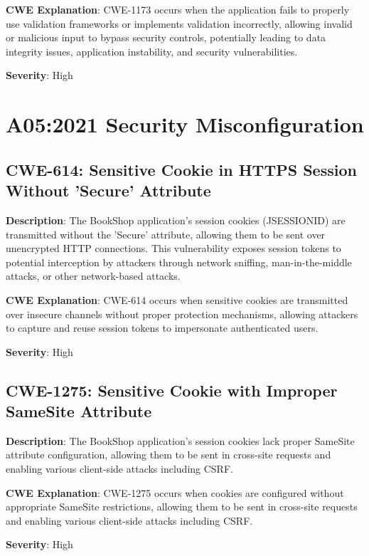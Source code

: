 \documentclass[]{UCD_CS_FYP_Report}
\begin{document}
\textbf{CWE Explanation}: CWE-1173 occurs when the application fails to properly use validation frameworks or implements validation incorrectly, allowing invalid or malicious input to bypass security controls, potentially leading to data integrity issues, application instability, and security vulnerabilities.

\textbf{Severity}: High




\chapter{A05:2021 Security Misconfiguration}

\section{CWE-614: Sensitive Cookie in HTTPS Session Without 'Secure' Attribute}

\textbf{Description}: The BookShop application's session cookies (JSESSIONID) are transmitted without the 'Secure' attribute, allowing them to be sent over unencrypted HTTP connections. This vulnerability exposes session tokens to potential interception by attackers through network sniffing, man-in-the-middle attacks, or other network-based attacks.

\textbf{CWE Explanation}: CWE-614 occurs when sensitive cookies are transmitted over insecure channels without proper protection mechanisms, allowing attackers to capture and reuse session tokens to impersonate authenticated users.

\textbf{Severity}: High



\section{CWE-1275: Sensitive Cookie with Improper SameSite Attribute}

\textbf{Description}: The BookShop application's session cookies lack proper SameSite attribute configuration, allowing them to be sent in cross-site requests and enabling various client-side attacks including CSRF.

\textbf{CWE Explanation}: CWE-1275 occurs when cookies are configured without appropriate SameSite restrictions, allowing them to be sent in cross-site requests and enabling various client-side attacks including CSRF.

\textbf{Severity}: High
\end{document}
